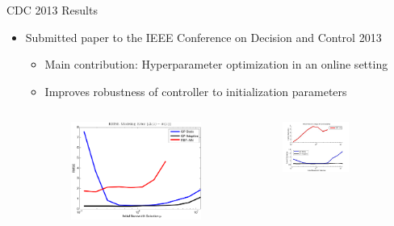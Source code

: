 \documentclass[11pt,mathserif]{beamer}
\begin{document}
\begin{frame}[t]{CDC 2013 Results}
	\begin{itemize}	\itemsep 0.1in
         \item Submitted paper to the IEEE Conference on Decision
              and Control 2013
          \begin{itemize}
          \item Main contribution: Hyperparameter optimization in an
            online setting
            \item Improves robustness of controller to initialization parameters
          \end{itemize}
	\end{itemize}
\begin{figure}	
\begin{columns}[T]
\begin{column}{.45\textwidth}
\begin{figure}
	\includegraphics[width=\columnwidth]{figures/RMSE_Model.pdf}
\end{figure}
\end{column}
\begin{column}{.45\textwidth}
\begin{figure}
  	\includegraphics[width=\columnwidth]{figures/ControlD3.jpg}

\end{figure}
\end{column}
\end{columns}
\end{figure}
\end{frame}
\end{document}
